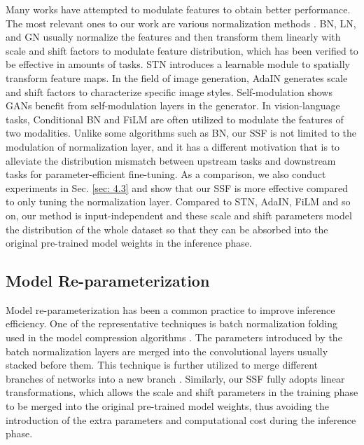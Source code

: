 Many works have attempted to modulate features to obtain better performance. The most relevant ones to our work are various normalization methods \cite{ioffe2015batch, ba2016layer, wu2018group}. BN, LN, and GN usually normalize the features and then transform them linearly with scale and shift factors to modulate feature distribution, which has been verified to be effective in amounts of tasks. STN \cite{jaderberg2015spatial} introduces a learnable module to spatially transform feature maps. In the field of image generation, AdaIN \cite{huang2017arbitrary} generates scale and shift factors to characterize specific image styles. Self-modulation \cite{chen2018self} shows GANs benefit from self-modulation layers in the generator. In vision-language tasks, Conditional BN \cite{de2017modulating} and FiLM \cite{perez2018film} are often utilized to modulate the features of two modalities. Unlike some algorithms such as BN, our SSF is not limited to the modulation of normalization layer, and it has a different motivation that is to alleviate the distribution mismatch between upstream tasks and downstream tasks for parameter-efficient fine-tuning. As a comparison, we also conduct experiments in Sec. \ref{sec: 4.3} and show that our SSF is more effective compared to only tuning the normalization layer. Compared to STN, AdaIN, FiLM and so on, our method is input-independent and these scale and shift parameters model the distribution of the whole dataset so that they can be absorbed into the original pre-trained model weights in the inference phase.

\subsection{Model Re-parameterization}

Model re-parameterization has been a common practice to improve inference efficiency. One of the representative techniques is batch normalization folding used in the model compression algorithms \cite{jacob2018quantization}. The parameters introduced by the batch normalization layers \cite{ioffe2015batch} are merged into the convolutional layers usually stacked before them. This technique is further utilized to merge different branches of networks into a new branch \cite{zagoruyko2017diracnets, ding2021repvgg, ding2021repmlp}. Similarly, our SSF fully adopts linear transformations, which allows the scale and shift parameters in the training phase to be merged into the original pre-trained model weights, thus avoiding the introduction of the extra parameters and computational cost during the inference phase. 


